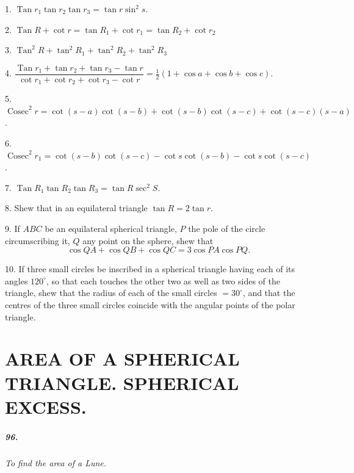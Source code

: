\documentclass{book}[2004/02/16]
\begin{document}
\begin{mainmatter}
\begin{spacing}{1.3}
1. $\operatorname{Tan} r_1 \tan r_2 \tan r_3 = \tan r \sin^2 s$.
\medskip

2. $\operatorname{Tan} R + \cot r = \tan R_1 + \cot r_1 = \tan R_2 + \cot r_2$\\
\medskip

3. $\operatorname{Tan}^2 R + \tan^2 R_1 + \tan^2 R_2 + \tan^2 R_3$\\
\medskip

4. $\dfrac{\operatorname{Tan} r_1 + \tan r_2 + \tan r_3 - \tan r}
       {\cot r_1 + \cot r_2 + \cot r_3 - \cot r}
= \tfrac{1}{2} (1 + \cos a + \cos b + \cos c)$.
\medskip

5. $\operatorname{Cosec}^2 r
= \cot (s - a) \cot (s - b)
+ \cot (s - b) \cot (s - c)
+ \cot (s - c)      (s - a)$.
\medskip

6. $\operatorname{Cosec}^2 r_1
= \cot (s - b) \cot (s - c)
- \cot s \cot (s - b)
- \cot s \cot (s - c)$.
\medskip

7. $\operatorname{Tan} R_1 \tan R_2 \tan R_3 = \tan R \sec^2 S$.
\medskip

8. Shew that in an equilateral triangle $\tan R = 2\tan r$.
\medskip

9. If $ABC$ be an equilateral spherical triangle, $P$ the pole of
the circle circumscribing it, $Q$ any point on the sphere, shew that
\[
  \cos QA + \cos QB + \cos QC = 3\cos PA \cos PQ.
\]

10. If three small circles be inscribed in a spherical triangle
having each of its angles $120^\circ$, so that each touches the other two
as well as two sides of the triangle, shew that the radius of each
of the small circles $= 30^\circ$, and that the centres of the three small
circles coincide with the angular points of the polar triangle.

\chapter[Area of a Spherical Triangle. Spherical Excess.]{AREA OF A SPHERICAL TRIANGLE\@. SPHERICAL EXCESS.}

\paragraph{96.} \textit{To find the area of a Lune.}


\end{spacing}
\end{mainmatter}
\end{document}
